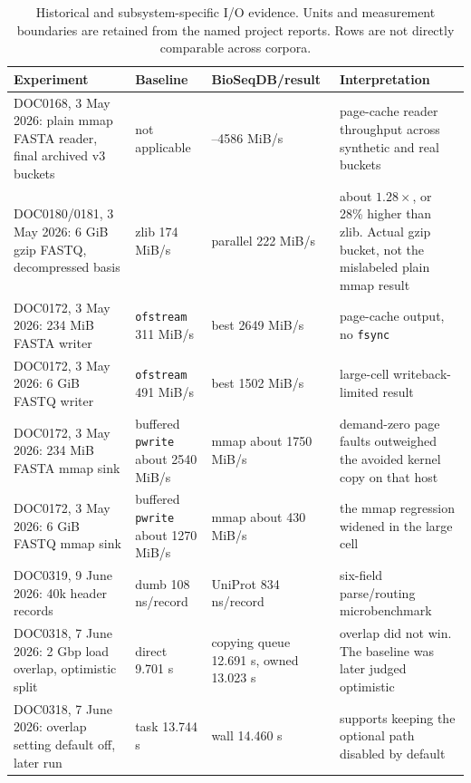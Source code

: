 \begin{table}[!t]
\centering
\scriptsize
\begin{tabularx}{\textwidth}{
  p{}
  >{\raggedleft\arraybackslash}p{}
  >{\raggedleft\arraybackslash}p{}
  X}
\toprule
\textbf{Experiment} & \textbf{Baseline} & \textbf{BioSeqDB/result} &
\textbf{Interpretation}\\
\midrule
DOC0168, 3 May 2026: plain mmap FASTA reader, final archived v3 buckets &
not applicable & 2694--4586 MiB/s &
page-cache reader throughput across synthetic and real buckets\\
DOC0180/0181, 3 May 2026: 6 GiB gzip FASTQ, decompressed basis &
zlib 174 MiB/s & parallel 222 MiB/s &
about \(1.28\times\), or 28\% higher than zlib. Actual gzip bucket, not the
mislabeled plain mmap result\\
DOC0172, 3 May 2026: 234 MiB FASTA writer &
\texttt{ofstream} 311 MiB/s & best 2649 MiB/s &
page-cache output, no \texttt{fsync}\\
DOC0172, 3 May 2026: 6 GiB FASTQ writer &
\texttt{ofstream} 491 MiB/s & best 1502 MiB/s &
large-cell writeback-limited result\\
DOC0172, 3 May 2026: 234 MiB FASTA mmap sink &
buffered \texttt{pwrite} about 2540 MiB/s & mmap about 1750 MiB/s &
demand-zero page faults outweighed the avoided kernel copy on that host\\
DOC0172, 3 May 2026: 6 GiB FASTQ mmap sink &
buffered \texttt{pwrite} about 1270 MiB/s & mmap about 430 MiB/s &
the mmap regression widened in the large cell\\
DOC0319, 9 June 2026: 40k header records &
dumb 108 ns/record & UniProt 834 ns/record &
six-field parse/routing microbenchmark\\
DOC0318, 7 June 2026: 2 Gbp load overlap, optimistic split &
direct 9.701 s & copying queue 12.691 s, owned 13.023 s &
overlap did not win. The baseline was later judged optimistic\\
DOC0318, 7 June 2026: overlap setting default off, later run &
task 13.744 s & wall 14.460 s &
supports keeping the optional path disabled by default\\
\bottomrule
\end{tabularx}
\caption{Historical and subsystem-specific I/O evidence. Units and measurement
boundaries are retained from the named project reports. Rows are not directly
comparable across corpora.}
\label{tab:io-evidence}
\end{table}

